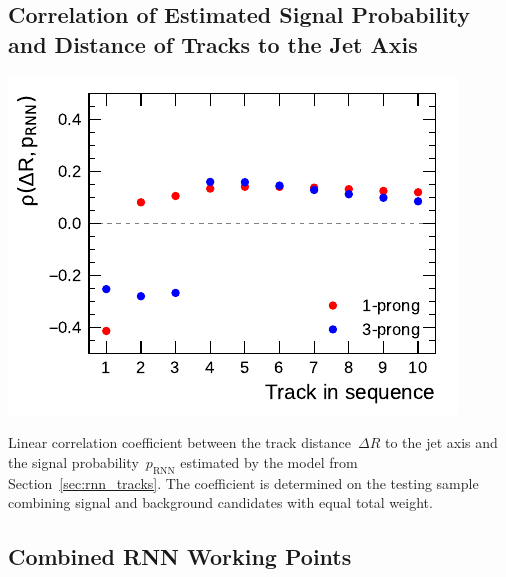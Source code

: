 \subsection{Correlation of Estimated Signal Probability and Distance of Tracks
  to the Jet Axis}
\label{app:corr_dr}

\noindent
\begin{minipage}{\textwidth}
  \captionsetup{type=figure}
  \centering
  \includegraphics{./figures/rnn/track/dR_corr.pdf}
  \caption{Linear correlation coefficient between the track distance~$\Delta R$
    to the jet axis and the signal probability~$p_\text{RNN}$ estimated by the
    model from Section~\ref{sec:rnn_tracks}. The coefficient is determined on
    the testing sample combining signal and background candidates with equal
    total weight.}
\end{minipage}

\subsection{Combined RNN Working Points}
\label{app:rnn_wp}

